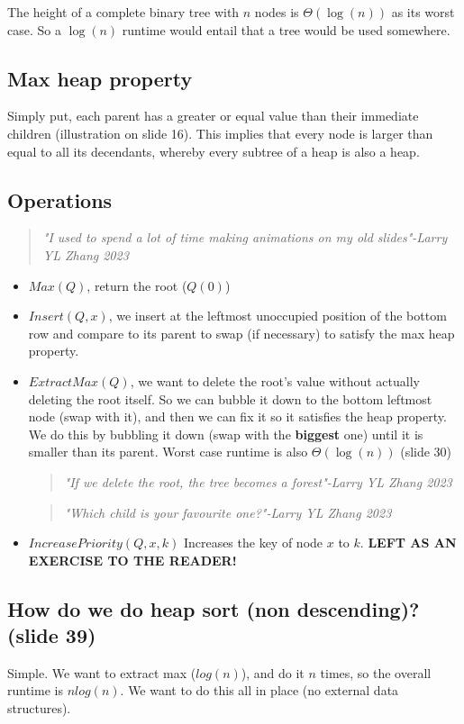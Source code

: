 \documentclass[12pt]{article}
\begin{document}
The height of a complete binary tree with $n$ nodes is $\Theta(\log(n))$ as its worst case. So a $\log(n)$ runtime would entail that a tree would be used somewhere.

\subsection*{Max heap property}
Simply put, each parent has a greater or equal value than their immediate children (illustration on slide 16). This implies that every node is larger than equal to all its decendants, whereby every subtree of a heap is also a heap.

\subsection*{Operations}
\begin{quote}
    \textit{"I used to spend a lot of time making animations on my old slides"-Larry YL Zhang 2023}
\end{quote}
\begin{itemize}
    \item $Max(Q)$, return the root ($Q(0)$)
    \item $Insert(Q,x)$, we insert at the leftmost unoccupied position of the bottom row and compare to its parent to swap (if necessary) to satisfy the max heap property.
    \item $ExtractMax(Q)$, we want to delete the root's value without actually deleting the root itself. So we can bubble it down to the bottom leftmost node (swap with it), and then we can fix it so it satisfies the heap property. We do this by bubbling it down (swap with the \textbf{biggest} one) until it is smaller than its parent. Worst case runtime is also $\Theta(\log(n))$ (slide 30)
    \begin{quote}
        \textit{"If we delete the root, the tree becomes a forest"-Larry YL Zhang 2023}
    \end{quote}
    
    \begin{quote}
        \textit{"Which child is your favourite one?"-Larry YL Zhang 2023}
    \end{quote}
    \item $IncreasePriority(Q,x,k)$ Increases the key of node $x$ to $k$. \textbf{LEFT AS AN EXERCISE TO THE READER!}
\end{itemize}

\subsection*{How do we do heap sort (non descending)? (slide 39)}
Simple. We want to extract max ($log(n)$), and do it $n$ times, so the overall runtime is $nlog(n)$. We want to do this all in place (no external data structures).\\
\end{document}
